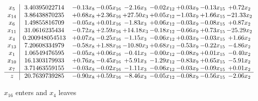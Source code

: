 \documentclass[9pt]{article}
\begin{document}
 \[\begin{array}{c| c c@{\hskip 2pt} c@{\hskip 2pt} c@{\hskip 2pt} c@{\hskip 2pt} c@{\hskip 2pt} c@{\hskip 2pt} c@{\hskip 2pt} }
 x_{5}   &  3.40395022714 & -0.13 x_{8} & -0.05 x_{16} & -2.16 x_{3} & -0.02 x_{12} & +  0.03 x_{9} & -0.13 x_{15} & +  0.72 x_{2}\\
 x_{14}   &  3.86438870235 & +  0.68 x_{8} & +  2.36 x_{16} & + 27.50 x_{3} & +  0.05 x_{12} & -1.03 x_{9} & +  1.66 x_{15} & -21.33 x_{2}\\
 x_{6}   &  1.49855816709 & -0.05 x_{8} & +  0.01 x_{16} & -1.83 x_{3} & +  0.06 x_{12} & -0.03 x_{9} & -0.08 x_{15} & +  0.87 x_{2}\\
 x_{11}   &  31.0616235434 & -0.72 x_{8} & +  2.59 x_{16} & + 14.18 x_{3} & -0.18 x_{12} & -0.66 x_{9} & +  0.73 x_{15} & -25.29 x_{2}\\
 x_{4}   &  0.200948054513 & +  0.07 x_{8} & -0.25 x_{16} & -1.15 x_{3} & -0.06 x_{12} & +  0.03 x_{9} & -0.03 x_{15} & +  1.66 x_{2}\\
 x_{13}   &  7.20608334979 & -0.58 x_{8} & +  1.88 x_{16} & -10.80 x_{3} & +  0.68 x_{12} & -0.53 x_{9} & -0.22 x_{15} & -4.86 x_{2}\\
 x_{1}   &  1.06549476595 & -0.05 x_{8} & +  0.06 x_{16} & -0.41 x_{3} & -0.00 x_{12} & -0.08 x_{9} & +  0.01 x_{15} & -0.40 x_{2}\\
 x_{10}   &  16.1303179933 & +  0.76 x_{8} & -0.45 x_{16} & +  5.91 x_{3} & -1.29 x_{12} & -0.83 x_{9} & +  0.65 x_{15} & -5.91 x_{2}\\
 x_{7}   &  3.71463559155 & -0.03 x_{8} & -0.02 x_{16} & -1.11 x_{3} & -0.06 x_{12} & -0.03 x_{9} & -0.09 x_{15} & +  0.01 x_{2}\\
\hline
z    &  20.7639739285 & -0.90 x_{8} & +  0.59 x_{16} & -8.46 x_{3} & -0.05 x_{12} & -0.08 x_{9} & -0.56 x_{15} & -2.06 x_{2}\\
\end{array}\]


 $ x_{16} $ enters and $ x_{4} $ leaves 
\end{document}
